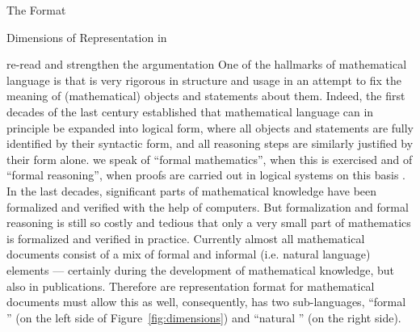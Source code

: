 \begin{omgroup}[creators=miko,id=spec-intro]{The {\omdoc} Format}
\begin{omgroup}[id=syntax-semantics]{Dimensions of Representation in {\omdoc}}
\begin{newpart}{re-read and strengthen the argumentation}
One of the hallmarks of mathematical language is that is very rigorous in structure and
usage in an attempt to fix the meaning of (mathematical) objects and statements about
them. Indeed, the first decades of the last century established that mathematical language
can in principle be expanded into logical form, where all objects and statements are fully
identified by their syntactic form, and all reasoning steps are similarly justified by
their form alone. we speak of ``formal mathematics'', when this is exercised and of
``formal reasoning'', when proofs are carried out in logical systems on this basis . In
the last decades, significant parts of mathematical knowledge have been formalized and
verified with the help of computers. But formalization and formal reasoning is still so
costly and tedious that only a very small part of mathematics is formalized and verified
in practice. Currently almost all mathematical documents consist of a mix of formal and
informal (i.e. natural language) elements --- certainly during the development of
mathematical knowledge, but also in publications. Therefore are representation format for
mathematical documents must allow this as well, consequently, \omdoc has two
sub-languages, ``formal \omdoc'' (on the left side of Figure~\ref{fig:dimensions}) and
``natural \omdoc'' (on the right side).


\end{newpart}
\end{omgroup}
\end{omgroup}

